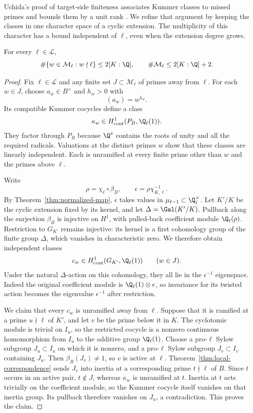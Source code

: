 Uchida's proof of target-side finiteness associates Kummer classes to missed primes and bounds them by a unit rank \cite[Proposition~1]{uchida1981}. We refine that argument by keeping the classes in one character space of a cyclic extension. The multiplicity of this character has a bound independent of $\ell$, even when the extension degree grows.

\begin{proposition}\label{prop:uniform-missed-primes}
For every $\ell\in\mathcal L$,
\[
 \#\{w\in\mathcal M_\ell:w\nmid\ell\}\le 2[K:\Q],
 \qquad
 \#\mathcal M_\ell\le 2[K:\Q]+2.
\]
\end{proposition}
\begin{proof}
Fix $\ell\in\mathcal L$ and any finite set $J\subset\mathcal M_\ell$ of primes away from $\ell$. For each $w\in J$, choose $a_w\in B^\times$ and $h_w>0$ with
\[
 (a_w)=w^{h_w}.
\]
Its compatible Kummer cocycles define a class
\[
 \kappa_w\in H^1_{\mathrm{cont}}(P_B,\Q_\ell(1)).
\]
They factor through $P_B$ because $\Q^s$ contains the roots of unity and all the required radicals. Valuations at the distinct primes $w$ show that these classes are linearly independent. Each is unramified at every finite prime other than $w$ and the primes above $\ell$.

Write
\[
 \rho=\chi_\ell\circ\beta_B,\qquad
 \epsilon=\rho\chi_{K,\ell}^{-1}.
\]
By Theorem~\ref{thm:normalized-map}, $\epsilon$ takes values in $\mu_{\ell-1}\subset\Q_\ell^\times$. Let $K'/K$ be the cyclic extension fixed by its kernel, and let $\Delta=\Gal(K'/K)$. Pullback along the surjection $\beta_B$ is injective on $H^1$, with pulled-back coefficient module $\Q_\ell(\rho)$. Restriction to $G_{K'}$ remains injective: its kernel is a first cohomology group of the finite group $\Delta$, which vanishes in characteristic zero. We therefore obtain independent classes
\[
 c_w\in H^1_{\mathrm{cont}}(G_{K'},\Q_\ell(1))
 \qquad(w\in J).
\]
Under the natural $\Delta$-action on this cohomology, they all lie in the $\epsilon^{-1}$ eigenspace. Indeed the original coefficient module is $\Q_\ell(1)\otimes\epsilon$, so invariance for its twisted action becomes the eigenvalue $\epsilon^{-1}$ after restriction.

We claim that every $c_w$ is unramified away from $\ell$. Suppose that it is ramified at a prime $u\nmid\ell$ of $K'$, and let $v$ be the prime below it in $K$. The cyclotomic module is trivial on $I_u$, so the restricted cocycle is a nonzero continuous homomorphism from $I_u$ to the additive group $\Q_\ell(1)$. Choose a pro-$\ell$ Sylow subgroup $J_u\subset I_u$ on which it is nonzero, and a pro-$\ell$ Sylow subgroup $J_v\subset I_v$ containing $J_u$. Then $\beta_B(J_v)\ne1$, so $v$ is active at $\ell$. Theorem~\ref{thm:local-correspondence} sends $J_v$ into inertia at a corresponding prime $t\nmid\ell$ of $B$. Since $t$ occurs in an active pair, $t\notin J$, whereas $\kappa_w$ is unramified at $t$. Inertia at $t$ acts trivially on the coefficient module, so the Kummer cocycle itself vanishes on that inertia group. Its pullback therefore vanishes on $J_u$, a contradiction. This proves the claim.


\end{proof}
